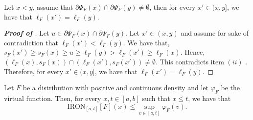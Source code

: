 \begin{lemma}
\label{lem:disjoint_subg}
Let $x < y$, assume that $\partial \Psi_{F}(x) \cap \partial \Psi_{F}(y) \neq \emptyset$, then for every $x' \in (x,y]$, we have that $\ell_{F}(x') = \ell_{F}(y)$.
\end{lemma}
\begin{proof}[\textbf{Proof of }]
Let $u \in \partial \Psi_{F}(x) \cap \partial \Psi_{F}(y).$ Let $x' \in (x,y)$ and assume for sake of contradiction that $\ell_{F}(x') < \ell_{F}(y)$. 
We have that, $s_{F}(x') \geq s_{F}(x) \geq u \geq \ell_{F}(y) > \ell_{F}(x') \geq \ell_{F}(x)$.
Hence, $(\ell_{F}(x), s_{F}(x)) \cap (\ell_{F}(x'), s_{F}(x')) \neq \emptyset$. This contradicts item $(ii)$ . Therefore, for every $x' \in (x,y]$, we have that $\ell_{F}(x') = \ell_{F}(y)$.
\end{proof}


\begin{lemma}
    \label{lem:iron_lower_virtual}
    Let $F$ be a distribution with positive and continuous density and let $\varphi_F$ be the virtual function. Then, for every $x,t \in [a,b]$ such that $x \leq t$, we have that
    \begin{equation*}
    \mathrm{IRON}_{[a,t]}[F](x) \leq \sup_{v \in [a,t]} \varphi_{F}(v). 
    \end{equation*}
\end{lemma}

